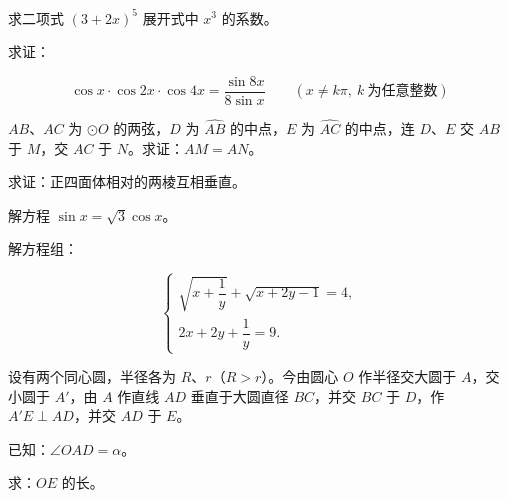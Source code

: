 


\begin{question}
求二项式 $(3+2x)^5$ 展开式中 $x^3$ 的系数。

\end{question}
\begin{question}
求证：

\nopagebreak[4]
\[
\cos x\cdot\cos 2x\cdot\cos 4x=\frac{\sin 8x}{8\sin x}\qquad(x\ne k\pi,\ k\ \text{为任意整数})
\]

\Needspace{0.4\textheight}
\end{question}
\begin{question}
$AB$、$AC$ 为 $\odot O$ 的两弦，$D$ 为 $\widehat{AB}$ 的中点，$E$ 为 $\widehat{AC}$ 的中点，连 $D$、$E$ 交 $AB$ 于 $M$，交 $AC$ 于 $N$。求证：$AM=AN$。
\nopagebreak[4]
\begin{center}\end{center}
\nopagebreak[4]
\Needspace{0.4\textheight}
\end{question}
\begin{question}
求证：正四面体相对的两棱互相垂直。
\nopagebreak[4]
\begin{center}\end{center}
\nopagebreak[4]
\end{question}
\begin{question}
解方程 $\sin x=\sqrt3\cos x$。

\end{question}

\begin{question}
解方程组：

\nopagebreak[4]
\[
\begin{cases}
\sqrt{x+\dfrac1y}+\sqrt{x+2y-1}=4,\\[4pt]
2x+2y+\dfrac1y=9.
\end{cases}
\]

\end{question}

\Needspace{0.4\textheight}
\begin{question}
设有两个同心圆，半径各为 $R$、$r$（$R>r$）。今由圆心 $O$ 作半径交大圆于 $A$，交小圆于 $A'$，由 $A$ 作直线 $AD$ 垂直于大圆直径 $BC$，并交 $BC$ 于 $D$，作 $A'E\perp AD$，并交 $AD$ 于 $E$。

已知：$\angle OAD=\alpha$。

求：$OE$ 的长。
\nopagebreak[4]
\begin{center}\end{center}
\nopagebreak[4]
\end{question}

